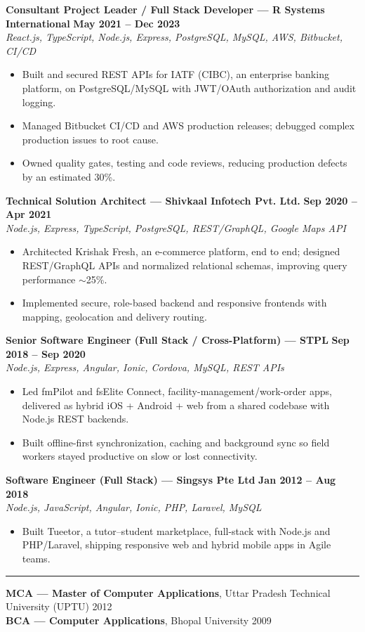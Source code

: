 \documentclass[10pt,a4paper]{article}
\newcommand{\resheading}[1]{\vspace{6pt}{\large\bfseries #1}\vspace{1pt}\hrule\vspace{4pt}}
\newcommand{\entry}[4]{{\bfseries #1} \hfill {\bfseries #2}\\{\itshape #3} \hfill {\itshape #4}\vspace{2pt}}
\begin{document}
\entry{Consultant Project Leader / Full Stack Developer --- R Systems International}{May 2021 -- Dec 2023}{React.js, TypeScript, Node.js, Express, PostgreSQL, MySQL, AWS, Bitbucket, CI/CD}{}
\begin{itemize}
  \item Built and secured REST APIs for IATF (CIBC), an enterprise banking platform, on PostgreSQL/MySQL with JWT/OAuth authorization and audit logging.
  \item Managed Bitbucket CI/CD and AWS production releases; debugged complex production issues to root cause.
  \item Owned quality gates, testing and code reviews, reducing production defects by an estimated 30\%.
\end{itemize}

\entry{Technical Solution Architect --- Shivkaal Infotech Pvt. Ltd.}{Sep 2020 -- Apr 2021}{Node.js, Express, TypeScript, PostgreSQL, REST/GraphQL, Google Maps API}{}
\begin{itemize}
  \item Architected Krishak Fresh, an e-commerce platform, end to end; designed REST/GraphQL APIs and normalized relational schemas, improving query performance $\sim$25\%.
  \item Implemented secure, role-based backend and responsive frontends with mapping, geolocation and delivery routing.
\end{itemize}

\entry{Senior Software Engineer (Full Stack / Cross-Platform) --- STPL}{Sep 2018 -- Sep 2020}{Node.js, Express, Angular, Ionic, Cordova, MySQL, REST APIs}{}
\begin{itemize}
  \item Led fmPilot and fsElite Connect, facility-management/work-order apps, delivered as hybrid iOS + Android + web from a shared codebase with Node.js REST backends.
  \item Built offline-first synchronization, caching and background sync so field workers stayed productive on slow or lost connectivity.
\end{itemize}

\entry{Software Engineer (Full Stack) --- Singsys Pte Ltd}{Jan 2012 -- Aug 2018}{Node.js, JavaScript, Angular, Ionic, PHP, Laravel, MySQL}{}
\begin{itemize}
  \item Built Tueetor, a tutor--student marketplace, full-stack with Node.js and PHP/Laravel, shipping responsive web and hybrid mobile apps in Agile teams.
\end{itemize}

\resheading{Education}
\textbf{MCA --- Master of Computer Applications}, Uttar Pradesh Technical University (UPTU) \hfill 2012\\
\textbf{BCA --- Computer Applications}, Bhopal University \hfill 2009
\end{document}
